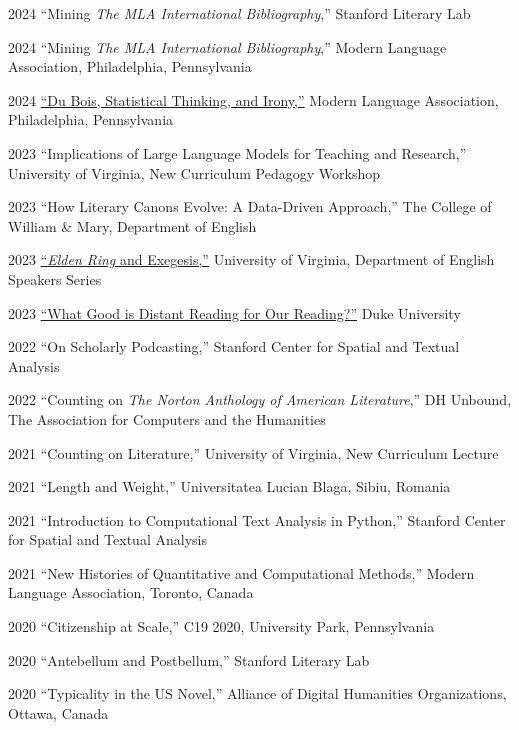 \documentclass[12pt,letterpaper]{report}
\begin{document}
\begin{tablist}
	\item[2024] \tab{}\enquote{Mining \emph{The MLA International Bibliography},} Stanford Literary Lab
	\item[2024] \tab{}\enquote{Mining \emph{The MLA International Bibliography},} Modern Language Association, Philadelphia, Pennsylvania
	\item[2024] \tab{}\href{https://fredner.org/files/mla24.html}{\enquote{Du Bois, Statistical Thinking, and Irony,}} Modern Language Association, Philadelphia, Pennsylvania
	\item[2023] \tab{}\enquote{Implications of Large Language Models for Teaching and Research,} University of Virginia, New Curriculum Pedagogy Workshop
	\item[2023] \tab{}\enquote{How Literary Canons Evolve: A Data-Driven Approach,} The College of William \& Mary, Department of English
	\item[2023] \tab{}\href{https://fredner.org/er/}{\enquote{\emph{Elden Ring} and Exegesis,}} University of Virginia, Department of English Speakers Series
	\item[2023] \tab{}\href{https://fredner.org/duke/}{\enquote{What Good is Distant Reading for Our Reading?}} Duke University
	\item[2022] \tab{}\enquote{On Scholarly Podcasting,} Stanford Center for Spatial and Textual Analysis
	\item[2022] \tab{}\enquote{Counting on \emph{The Norton Anthology of American Literature},} DH Unbound, The Association for Computers and the Humanities
	\item[2021] \tab{}\enquote{Counting on Literature,} University of Virginia, New Curriculum Lecture
	\item[2021] \tab{}\enquote{Length and Weight,} Universitatea Lucian Blaga, Sibiu, Romania
	\item[2021] \tab{}\enquote{Introduction to Computational Text Analysis in Python,} Stanford Center for Spatial and Textual Analysis
	\item[2021] \tab{}\enquote{New Histories of Quantitative and Computational Methods,} Modern Language Association, Toronto, Canada
	\item[2020] \tab{}\enquote{Citizenship at Scale,} C19 2020, University Park, Pennsylvania
	\item[2020] \tab{}\enquote{Antebellum and Postbellum,} Stanford Literary Lab
	\item[2020] \tab{}\enquote{Typicality in the US Novel,} Alliance of Digital Humanities Organizations, Ottawa, Canada

\end{tablist}
\end{document}
